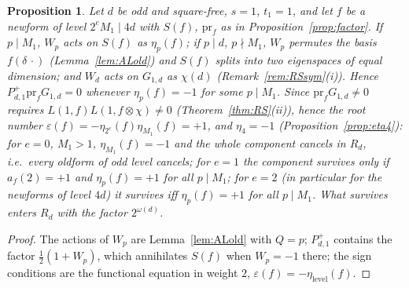 ﻿\documentclass[11pt]{amsart}
\newtheorem{proposition}[theorem]{Proposition}
\theoremstyle{remark}
\begin{document}
\begin{proposition}\label{prop:cancel}
Let $d$ be odd and square-free, $s=1$, $t_1=1$, and let $f$ be a newform of level $2^eM_1\mid4d$ with $S(f)$, $\mathrm{pr}_f$ as in Proposition~\ref{prop:factor}. If $p\mid M_1$, $W_p$ acts on $S(f)$ as $\eta_p(f)$; if $p\mid d$, $p\nmid M_1$, $W_p$ permutes the basis $f(\delta\,\cdot)$ (Lemma~\ref{lem:ALold}) and $S(f)$ splits into two eigenspaces of equal dimension; and $W_d$ acts on $G_{1,d}$ as $\chi(d)$ (Remark~\ref{rem:RSsym}(i)). Hence $P^+_{d,1}\mathrm{pr}_fG_{1,d}=0$ whenever $\eta_p(f)=-1$ for some $p\mid M_1$. Since $\mathrm{pr}_fG_{1,d}\ne0$ requires $L(1,f)L(1,f\otimes\chi)\ne0$ (Theorem~\ref{thm:RS}(ii)), hence the root number $\varepsilon(f)=-\eta_{2^e}(f)\eta_{M_1}(f)=+1$, and $\eta_4=-1$ (Proposition~\ref{prop:eta4}): for $e=0$, $M_1>1$, $\eta_{M_1}(f)=-1$ and the whole component cancels in $R_d$, i.e.\ \emph{every oldform of odd level cancels}; for $e=1$ the component survives only if $a_f(2)=+1$ and $\eta_p(f)=+1$ for all $p\mid M_1$; for $e=2$ (in particular for the newforms of level $4d$) it survives iff $\eta_p(f)=+1$ for all $p\mid M_1$. What survives enters $R_d$ with the factor $2^{\omega(d)}$.
\end{proposition}
\begin{proof}
The actions of $W_p$ are Lemma~\ref{lem:ALold} with $Q=p$; $P^+_{d,1}$ contains the factor $\frac12(1+W_p)$, which annihilates $S(f)$ when $W_p=-1$ there; the sign conditions are the functional equation in weight $2$, $\varepsilon(f)=-\eta_{\mathrm{level}}(f)$.
\end{proof}
\end{document}
